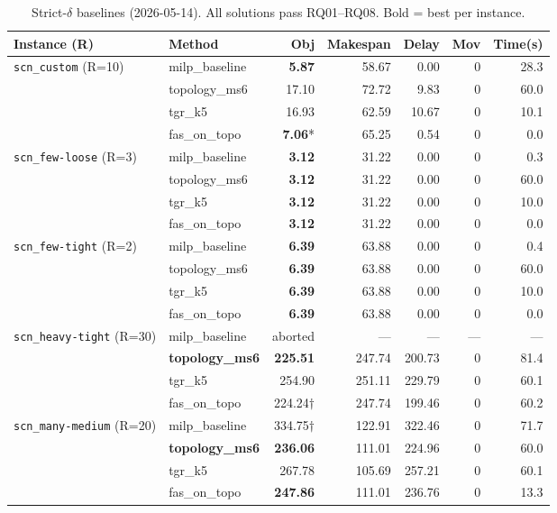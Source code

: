 \begin{table}[h]
\centering
\caption{Strict-$\delta$ baselines (2026-05-14).  All solutions pass RQ01--RQ08.
Bold = best per instance.}
\label{tab:exp04}
\begin{tabular}{llrrrrr}
\toprule
Instance (R) & Method & Obj & Makespan & Delay & Mov & Time(s) \\
\midrule
\multirow{4}{*}{\texttt{scn\_custom} (R=10)}
 & milp\_baseline & \textbf{5.87}  &  58.67 &  0.00 & 0 & 28.3 \\
 & topology\_ms6  & 17.10          &  72.72 &  9.83 & 0 & 60.0 \\
 & tgr\_k5        & 16.93          &  62.59 & 10.67 & 0 & 10.1 \\
 & fas\_on\_topo  & \textbf{7.06}* &  65.25 &  0.54 & 0 &  0.0 \\
\midrule
\multirow{4}{*}{\texttt{scn\_few-loose} (R=3)}
 & milp\_baseline & \textbf{3.12}  &  31.22 &  0.00 & 0 &  0.3 \\
 & topology\_ms6  & \textbf{3.12}  &  31.22 &  0.00 & 0 & 60.0 \\
 & tgr\_k5        & \textbf{3.12}  &  31.22 &  0.00 & 0 & 10.0 \\
 & fas\_on\_topo  & \textbf{3.12}  &  31.22 &  0.00 & 0 &  0.0 \\
\midrule
\multirow{4}{*}{\texttt{scn\_few-tight} (R=2)}
 & milp\_baseline & \textbf{6.39}  &  63.88 &  0.00 & 0 &  0.4 \\
 & topology\_ms6  & \textbf{6.39}  &  63.88 &  0.00 & 0 & 60.0 \\
 & tgr\_k5        & \textbf{6.39}  &  63.88 &  0.00 & 0 & 10.0 \\
 & fas\_on\_topo  & \textbf{6.39}  &  63.88 &  0.00 & 0 &  0.0 \\
\midrule
\multirow{3}{*}{\texttt{scn\_heavy-tight} (R=30)}
 & milp\_baseline & aborted         &     — &     — & — &    — \\
 & \textbf{topology\_ms6} & \textbf{225.51} & 247.74 & 200.73 & 0 & 81.4 \\
 & tgr\_k5        & 254.90          & 251.11 & 229.79 & 0 & 60.1 \\
 & fas\_on\_topo  & 224.24$\dagger$ & 247.74 & 199.46 & 0 & 60.2 \\
\midrule
\multirow{4}{*}{\texttt{scn\_many-medium} (R=20)}
 & milp\_baseline & 334.75$\dagger$ & 122.91 & 322.46 & 0 & 71.7 \\
 & \textbf{topology\_ms6}  & \textbf{236.06} & 111.01 & 224.96 & 0 & 60.0 \\
 & tgr\_k5        & 267.78          & 105.69 & 257.21 & 0 & 60.1 \\
 & fas\_on\_topo  & \textbf{247.86} & 111.01 & 236.76 & 0 & 13.3 \\
\bottomrule
\end{tabular}
\end{table}

